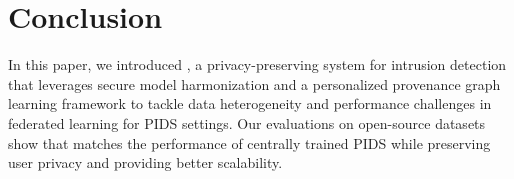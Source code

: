\section{Conclusion}
\label{sec:conclusion}

In this paper, we introduced \Sys, a privacy-preserving system for intrusion detection that leverages secure model harmonization and a personalized provenance graph learning framework to tackle data heterogeneity and performance challenges in federated learning for PIDS settings. Our evaluations on open-source datasets show that \Sys matches the performance of centrally trained PIDS while preserving user privacy and providing better scalability.